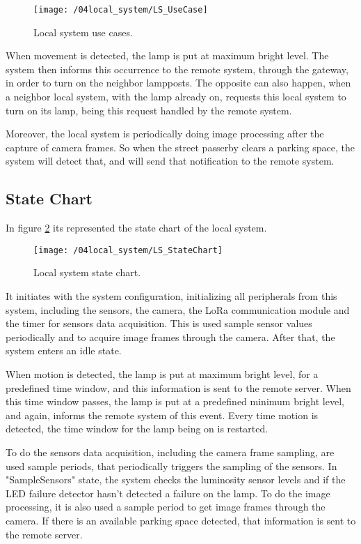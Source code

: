 \begin{figure}[ht] 
	\centering
	\texttt{[image: /04local\_system/LS\_UseCase]}
	\caption{Local system use cases.}
	\label{fig:ls_use_cases}
\end{figure}

When movement is detected, the lamp is put at maximum bright level. The system then informs this occurrence to the remote system, through the gateway, in order to turn on the neighbor lampposts. The opposite can also happen, when a neighbor local system, with the lamp already on, requests this local system to turn on its lamp, being this request handled by the remote system. 

Moreover, the local system is periodically doing image processing after the capture of camera frames. So when the street passerby clears a parking space, the system will detect that, and will send that notification to the remote system.

\clearpage
\subsection{State Chart}
In figure \ref{fig:ls_state_chart} its represented the state chart of the local system. 

\begin{figure}[H]
	\centering
	\texttt{[image: /04local\_system/LS\_StateChart]}
	\caption{Local system state chart.}
	\label{fig:ls_state_chart}
\end{figure}

It initiates with the system configuration, initializing all peripherals from this system, including the sensors, the camera, the LoRa communication module and the timer for sensors data acquisition. This is used sample sensor values periodically and to acquire image frames through the camera. After that, the system enters an idle state.

When motion is detected, the lamp is put at maximum bright level, for a predefined time window, and this information is sent to the remote server. When this time window passes, the lamp is put at a predefined minimum bright level, and again, informs the remote system of this event. Every time motion is detected, the time window for the lamp being on is restarted.

To do the sensors data acquisition, including the camera frame sampling, are used sample periods, that periodically triggers the sampling of the sensors. In "SampleSensors" state, the system checks the luminosity sensor levels and if the LED failure detector hasn't detected a failure on the lamp. To do the image processing, it is also used a sample period to get image frames through the camera. If there is an available parking space detected, that information is sent to the remote server.

